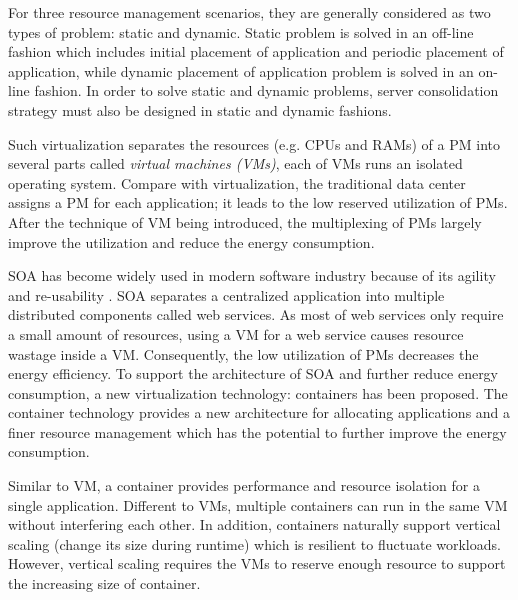  For three resource management scenarios, they are generally considered as two types of problem: static and dynamic. Static problem is solved in an off-line fashion which includes initial placement of application and periodic placement of application, while dynamic placement of application problem is solved in an on-line fashion. In order to solve static and dynamic problems, server consolidation strategy must also be designed in static and dynamic fashions. 


 Such virtualization separates the resources (e.g. CPUs and RAMs) of a PM into several parts called \emph{virtual machines (VMs)}, each of VMs runs an isolated operating system. Compare with virtualization, the traditional data center assigns a PM for each application; it leads to the low reserved utilization of PMs. After the technique of VM being introduced, the multiplexing of PMs largely improve the utilization and reduce the energy consumption. 

 SOA has become widely used in modern software industry because of its agility and re-usability \cite{Sprott:2004wt}. SOA separates a centralized application into multiple distributed components called web services. As most of web services only require a small amount of resources,  using a VM for a web service causes resource wastage inside a VM. Consequently, the low utilization of PMs decreases the energy efficiency. To support the architecture of SOA and further reduce energy consumption, a new virtualization technology: containers \cite{Felter:2015ki, Soltesz:2007cu} has been proposed. The container technology provides a new architecture for allocating applications and a finer resource management which has the potential to further improve the energy consumption.

 Similar to VM, a container provides performance and resource isolation for a single application. Different to VMs, multiple containers can run in the same VM without interfering each other. In addition, containers naturally support vertical scaling (change its size during runtime)\cite{Vaquero:2011gb} which is resilient to fluctuate workloads. However, vertical scaling requires the VMs to reserve enough resource to support the increasing size of container.

